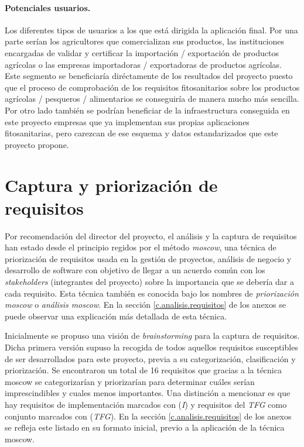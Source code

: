 \paragraph*{Potenciales usuarios.} Los diferentes tipos de usuarios a los que está dirigida la aplicación final. Por una parte serían los  agricultores que comercializan sus productos, las instituciones encargadas de validar y certificar la importación / exportación  de productos agrícolas o las empresas importadoras / exportadoras de productos agrícolas. Este segmento se beneficiaría diréctamente de los resultados del proyecto puesto que el proceso de comprobación de los requisitos fitosanitarios sobre los productos agrícolas / pesqueros / alimentarios se conseguiría de manera mucho más sencilla. Por otro lado también se podrían beneficiar de la infraestructura conseguida en este proyecto empresas que ya implementan sus propias aplicaciones fitosanitarias, pero carezcan de ese esquema y datos estandarizados que este proyecto propone.




\section{Captura y priorización de requisitos} \label{phytoscheme.requisitos}
\par 
Por recomendación del director del proyecto, el análisis y la captura de requisitos han estado desde el principio  regidos por el método \textit{\gls{moscow}}, una técnica de priorización de requisitos usada en la gestión de proyectos, análisis de negocio y desarrollo de software con objetivo de llegar a un acuerdo común con los \textit{stakeholders} (integrantes del proyecto) sobre la importancia que se debería dar a cada requisito. Esta técnica también es conocida bajo los nombres de \textit{priorización \gls{moscow}} o \textit{análisis \gls{moscow}}. En la sección \ref{c.analisis.requisitos} de los anexos se puede observar una explicación más detallada de esta técnica.

\par Inicialmente se propuso una visión de \textit{brainstorming} para la captura de requisitos. Dicha primera versión supuso la recogida de todos aquellos requisitos susceptibles de ser desarrollados para este proyecto, previa a su categorización, clasificación y priorización. Se encontraron un total de 16 requisitos que gracias a la técnica \gls{moscow} se categorizarían y priorizarían para determinar cuáles serían imprescindibles y cuales menos importantes. Una distinción a mencionar es que hay requisitos de implementación marcados con (\textit{I}) y requisitos del \textit{TFG} como conjunto marcados con (\textit{TFG}). En la sección \ref{c.analisis.requisitos} de los anexos se refleja este listado en su formato inicial, previo a la aplicación de la técnica \gls{moscow}.



